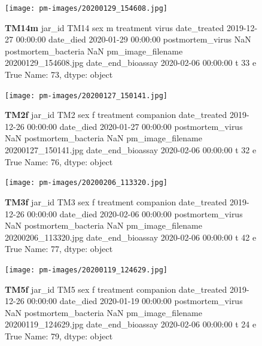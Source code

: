 \begin{figure}[h!]
\centering
\texttt{[image: pm-images/20200129\_154608.jpg]}
\caption{\textbf{TM14m} jar\_id                                TM14
sex                                      m
treatment                            virus
date\_treated           2019-12-27 00:00:00
date\_died              2020-01-29 00:00:00
postmortem\_virus                       NaN
postmortem\_bacteria                    NaN
pm\_image\_filename      20200129\_154608.jpg
date\_end\_bioassay      2020-02-06 00:00:00
t                                       33
e                                     True
Name: 73, dtype: object}
\end{figure}
\clearpage

\begin{figure}[h!]
\centering
\texttt{[image: pm-images/20200127\_150141.jpg]}
\caption{\textbf{TM2f} jar\_id                                 TM2
sex                                      f
treatment                        companion
date\_treated           2019-12-26 00:00:00
date\_died              2020-01-27 00:00:00
postmortem\_virus                       NaN
postmortem\_bacteria                    NaN
pm\_image\_filename      20200127\_150141.jpg
date\_end\_bioassay      2020-02-06 00:00:00
t                                       32
e                                     True
Name: 76, dtype: object}
\end{figure}
\clearpage

\begin{figure}[h!]
\centering
\texttt{[image: pm-images/20200206\_113320.jpg]}
\caption{\textbf{TM3f} jar\_id                                 TM3
sex                                      f
treatment                        companion
date\_treated           2019-12-26 00:00:00
date\_died              2020-02-06 00:00:00
postmortem\_virus                       NaN
postmortem\_bacteria                    NaN
pm\_image\_filename      20200206\_113320.jpg
date\_end\_bioassay      2020-02-06 00:00:00
t                                       42
e                                     True
Name: 77, dtype: object}
\end{figure}
\clearpage

\begin{figure}[h!]
\centering
\texttt{[image: pm-images/20200119\_124629.jpg]}
\caption{\textbf{TM5f} jar\_id                                 TM5
sex                                      f
treatment                        companion
date\_treated           2019-12-26 00:00:00
date\_died              2020-01-19 00:00:00
postmortem\_virus                       NaN
postmortem\_bacteria                    NaN
pm\_image\_filename      20200119\_124629.jpg
date\_end\_bioassay      2020-02-06 00:00:00
t                                       24
e                                     True
Name: 79, dtype: object}
\end{figure}
\clearpage

